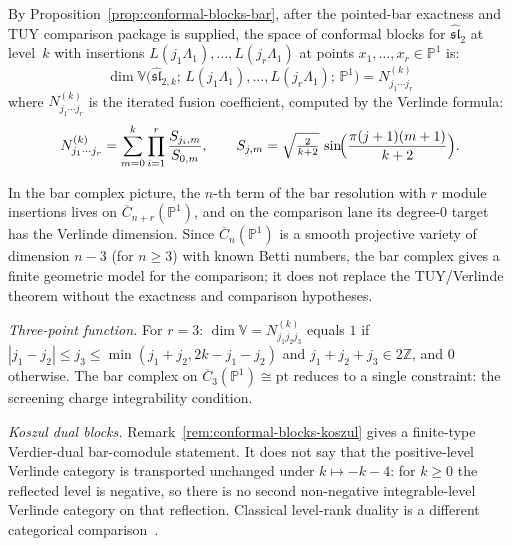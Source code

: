 \begin{example}\label{ex:conformal-blocks-sl2}
By Proposition~\ref{prop:conformal-blocks-bar}, after the pointed-bar
exactness and TUY comparison package is supplied, the space of
conformal blocks for $\widehat{\mathfrak{sl}}_2$ at level~$k$
with insertions $L(j_1\Lambda_1), \ldots, L(j_r\Lambda_1)$
at points $x_1, \ldots, x_r \in \mathbb{P}^1$ is:
\[
\dim \mathbb{V}\bigl(
\widehat{\mathfrak{sl}}_{2,k};\,
L(j_1\Lambda_1), \ldots, L(j_r\Lambda_1);\, \mathbb{P}^1
\bigr)
= N_{j_1 \cdots j_r}^{(k)}
\]
where $N_{j_1 \cdots j_r}^{(k)}$ is the iterated fusion
coefficient, computed by the Verlinde formula:
\begin{equation}\label{eq:verlinde-sl2}
N_{j_1 \cdots j_r}^{(k)}
= \sum_{m=0}^{k}
\prod_{i=1}^{r}
\frac{S_{j_i,m}}{S_{0,m}},
\qquad
S_{j,m} = \sqrt{\tfrac{2}{k+2}}\,
\sin\!\Bigl(\frac{\pi(j+1)(m+1)}{k+2}\Bigr).
\end{equation}

In the bar complex picture, the $n$-th term of the bar resolution
with $r$ module insertions lives on
$\overline{C}_{n+r}(\mathbb{P}^1)$, and on the comparison lane its
degree-$0$ target has the Verlinde dimension. Since
$\overline{C}_n(\mathbb{P}^1)$ is a smooth projective variety
of dimension $n - 3$ (for $n \geq 3$) with known Betti numbers,
the bar complex gives a finite geometric model for the comparison; it
does not replace the TUY/Verlinde theorem without the exactness and
comparison hypotheses.

\emph{Three-point function.}
For $r = 3$: $\dim \mathbb{V} = N_{j_1 j_2 j_3}^{(k)}$ equals
$1$ if $|j_1 - j_2| \leq j_3 \leq \min(j_1+j_2,
2k - j_1 - j_2)$ and $j_1 + j_2 + j_3 \in 2\mathbb{Z}$, and
$0$ otherwise. The bar complex on
$\overline{C}_3(\mathbb{P}^1) \cong \mathrm{pt}$ reduces to a
single constraint: the screening charge integrability condition.

\emph{Koszul dual blocks.}
Remark~\ref{rem:conformal-blocks-koszul} gives a finite-type
Verdier-dual bar-comodule statement. It does not say that the
positive-level Verlinde category is transported unchanged under
$k \mapsto -k - 4$: for $k\ge0$ the reflected level is negative, so
there is no second non-negative integrable-level Verlinde category on
that reflection. Classical level-rank duality is a different
categorical comparison~\cite{NakanishiTsuchiya}.
\end{example}

